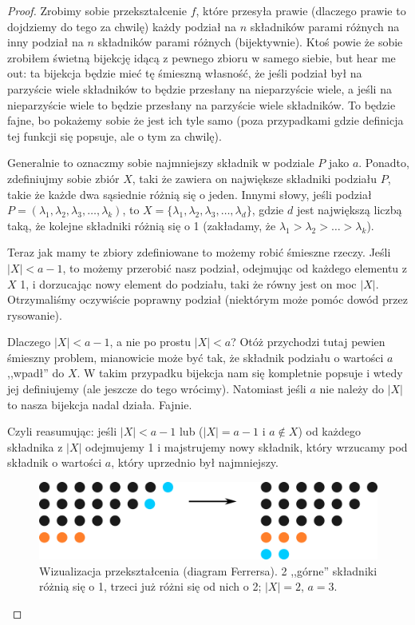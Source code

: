 \begin{proof}
	Zrobimy sobie przekształcenie $f$, które przesyła prawie (dlaczego prawie to dojdziemy do tego za chwilę) każdy podział na $n$ składników parami różnych na inny podział na $n$ składników parami różnych (bijektywnie). Ktoś powie że sobie zrobiłem świetną bijekcję idącą z pewnego zbioru w samego siebie, but hear me out: ta bijekcja będzie mieć tę śmieszną własność, że jeśli podział był na parzyście wiele składników to będzie przesłany na nieparzyście wiele, a jeśli na nieparzyście wiele to będzie przesłany na parzyście wiele składników. To będzie fajne, bo pokażemy sobie że jest ich tyle samo (poza przypadkami gdzie definicja tej funkcji się popsuje, ale o tym za chwilę).

	Generalnie to oznaczmy sobie najmniejszy składnik w podziale $P$ jako $a$. Ponadto, zdefiniujmy sobie zbiór $X$, taki że zawiera on największe składniki podziału $P$, takie że każde dwa sąsiednie różnią się o jeden. Innymi słowy, jeśli podział $P = (\lambda_1, \lambda_2, \lambda_3, \dots, \lambda_k)$, to $X =\{\lambda_1, \lambda_2, \lambda_3, \dots, \lambda_d\}$, gdzie $d$ jest największą liczbą taką, że kolejne składniki różnią się o 1  (zakładamy, że $\lambda_1 > \lambda_2 > \dots > \lambda_k$).

	Teraz jak mamy te zbiory zdefiniowane to możemy robić śmieszne rzeczy. Jeśli $|X| < a - 1$, to możemy przerobić nasz podział, odejmując od każdego elementu z $X$ 1, i dorzucając nowy element do podziału, taki że równy jest on moc $|X|$. Otrzymaliśmy oczywiście poprawny podział (niektórym może pomóc dowód przez rysowanie).

	Dlaczego $|X| < a - 1$, a nie po prostu $|X| < a$? Otóż przychodzi tutaj pewien śmieszny problem, mianowicie może być tak, że składnik podziału o wartości $a$ ,,wpadł'' do $X$. W takim przypadku bijekcja nam się kompletnie popsuje i wtedy jej definiujemy (ale jeszcze do tego wrócimy). Natomiast jeśli $a$ nie należy do $|X|$ to nasza bijekcja nadal działa. Fajnie.

	Czyli reasumując: jeśli $|X| < a - 1$ lub ($|X| = a - 1$ i $a \not \in X$) od każdego składnika z $|X|$ odejmujemy 1 i majstrujemy nowy składnik, który wrzucamy pod składnik o wartości $a$, który uprzednio był najmniejszy.

	\begin{figure}[H]
		\centering
		\includegraphics{images/case2.png}
		\caption{Wizualizacja przekształcenia (diagram Ferrersa). 2 ,,górne'' składniki różnią się o 1, trzeci już różni się od nich o 2; $|X| = 2$, $a=3$.}
	\end{figure}


\end{proof}
